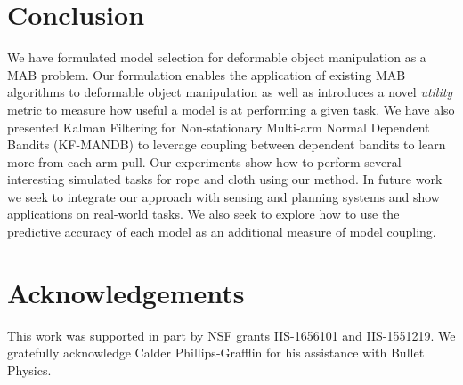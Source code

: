 \section{Conclusion}

We have formulated model selection for deformable object manipulation as a MAB problem. Our formulation enables the application of existing MAB algorithms to deformable object manipulation as well as introduces a novel \textit{utility} metric to measure how useful a model is at performing a given task. We have also presented Kalman Filtering for Non-stationary Multi-arm Normal Dependent Bandits (KF-MANDB) to leverage coupling between dependent bandits to learn more from each arm pull. Our experiments show how to perform several interesting simulated tasks for rope and cloth using our method.  In future work we seek to integrate our approach with sensing and planning systems and show applications on real-world tasks. We also seek to explore how to use the predictive accuracy of each model as an additional measure of model coupling.



\section*{Acknowledgements}

This work was supported in part by NSF grants IIS-1656101 and IIS-1551219. We gratefully acknowledge Calder Phillips-Grafflin for his assistance with Bullet Physics.
